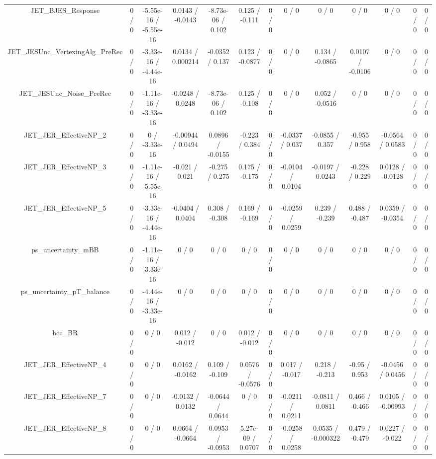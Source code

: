 \documentclass[10pt]{article}
\begin{document}
\begin{table}[htbp]
\begin{center}
\begin{tabular}{|c|c|c|c|c|c|c|c|c|c|c|c|c|}
  JET_BJES_Response & 0 / 0 & -5.55e-16 / -5.55e-16 & 0.0143 / -0.0143 & -8.73e-06 / 0.102 & 0.125 / -0.111 & 0 / 0 & 0 / 0 & 0 / 0 & 0 / 0 & 0 / 0 & 0 / 0 & 0 / 0 \\ 
  JET_JESUnc_VertexingAlg_PreRec & 0 / 0 & -3.33e-16 / -4.44e-16 & 0.0134 / 0.000214 & -0.0352 / 0.137 & 0.123 / -0.0877 & 0 / 0 & 0 / 0 & 0.134 / -0.0865 & 0.0107 / -0.0106 & 0 / 0 & 0 / 0 & 0 / 0 \\ 
  JET_JESUnc_Noise_PreRec & 0 / 0 & -1.11e-16 / -3.33e-16 & -0.0248 / 0.0248 & -8.73e-06 / 0.102 & 0.125 / -0.108 & 0 / 0 & 0 / 0 & 0.052 / -0.0516 & 0 / 0 & 0 / 0 & 0 / 0 & 0 / 0 \\ 
  JET_JER_EffectiveNP_2 & 0 / 0 & 0 / -3.33e-16 & -0.00944 / 0.0494 & 0.0896 / -0.0155 & -0.223 / 0.384 & 0 / 0 & -0.0337 / 0.037 & -0.0855 / 0.357 & -0.955 / 0.958 & -0.0564 / 0.0583 & 0 / 0 & 0 / 0 \\ 
  JET_JER_EffectiveNP_3 & 0 / 0 & -1.11e-16 / -5.55e-16 & -0.021 / 0.021 & -0.275 / 0.275 & 0.175 / -0.175 & 0 / 0 & -0.0104 / 0.0104 & -0.0197 / 0.0243 & -0.228 / 0.229 & 0.0128 / -0.0128 & 0 / 0 & 0 / 0 \\ 
  JET_JER_EffectiveNP_5 & 0 / 0 & -3.33e-16 / -4.44e-16 & -0.0404 / 0.0404 & 0.308 / -0.308 & 0.169 / -0.169 & 0 / 0 & -0.0259 / 0.0259 & 0.239 / -0.239 & 0.488 / -0.487 & 0.0359 / -0.0354 & 0 / 0 & 0 / 0 \\ 
  ps_uncertainty_mBB & 0 / 0 & -1.11e-16 / -3.33e-16 & 0 / 0 & 0 / 0 & 0 / 0 & 0 / 0 & 0 / 0 & 0 / 0 & 0 / 0 & 0 / 0 & 0 / 0 & 0 / 0 \\ 
  ps_uncertainty_pT_balance & 0 / 0 & -4.44e-16 / -3.33e-16 & 0 / 0 & 0 / 0 & 0 / 0 & 0 / 0 & 0 / 0 & 0 / 0 & 0 / 0 & 0 / 0 & 0 / 0 & 0 / 0 \\ 
  hcc_BR & 0 / 0 & 0 / 0 & 0.012 / -0.012 & 0 / 0 & 0.012 / -0.012 & 0 / 0 & 0 / 0 & 0 / 0 & 0 / 0 & 0 / 0 & 0 / 0 & 0 / 0 \\ 
  JET_JER_EffectiveNP_4 & 0 / 0 & 0 / 0 & 0.0162 / -0.0162 & 0.109 / -0.109 & 0.0576 / -0.0576 & 0 / 0 & 0.017 / -0.017 & 0.218 / -0.213 & -0.95 / 0.953 & -0.0456 / 0.0456 & 0 / 0 & 0 / 0 \\ 
  JET_JER_EffectiveNP_7 & 0 / 0 & 0 / 0 & -0.0132 / 0.0132 & -0.0644 / 0.0644 & 0 / 0 & 0 / 0 & -0.0211 / 0.0211 & -0.0811 / 0.0811 & 0.466 / -0.466 & 0.0105 / -0.00993 & 0 / 0 & 0 / 0 \\ 
  JET_JER_EffectiveNP_8 & 0 / 0 & 0 / 0 & 0.0664 / -0.0664 & 0.0953 / -0.0953 & 5.27e-09 / 0.0707 & 0 / 0 & -0.0258 / 0.0258 & 0.0535 / -0.000322 & 0.479 / -0.479 & 0.0227 / -0.022 & 0 / 0 & 0 / 0 \\ 

\end{tabular}
\end{center}
\end{table}
\end{document}
